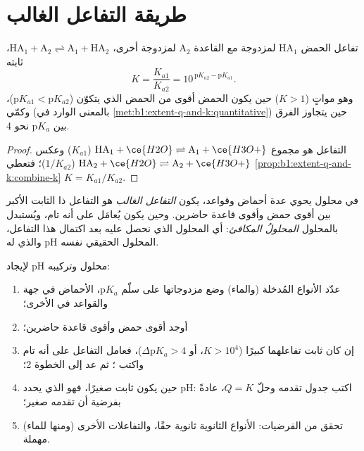 \section{طريقة التفاعل الغالب}

\begin{proposition}\label{prop:b1:predominant-reaction:k-of-reaction}
تفاعل الحمض $\mathrm{HA}_1$ لمزدوجة مع القاعدة
$\mathrm{A}_2$ لمزدوجة أخرى،
$\mathrm{HA}_1 + \mathrm{A}_2 \rightleftharpoons \mathrm{A}_1 + \mathrm{HA}_2$،
ثابته
\[
  K = \frac{K_{a1}}{K_{a2}} = 10^{\,\mathrm{p}K_{a2} - \mathrm{p}K_{a1}} .
\]
وهو مواتٍ ($K > 1$) حين يكون الحمض أقوى من الحمض الذي
يتكوّن ($\mathrm{p}K_{a1} < \mathrm{p}K_{a2}$)، وكمّي (بالمعنى
الوارد في \cref{met:b1:extent-q-and-k:quantitative}) حين يتجاوز الفرق
بين $\mathrm{p}K_a$ نحو 4.
\end{proposition}

\begin{proof}
التفاعل هو مجموع $\mathrm{HA}_1 + \ce{H2O} \rightleftharpoons
\mathrm{A}_1 + \ce{H3O+}$ ($K_{a1}$) وعكس $\mathrm{HA}_2 +
\ce{H2O} \rightleftharpoons \mathrm{A}_2 + \ce{H3O+}$ ($1/K_{a2}$)؛
فتعطي \cref{prop:b1:extent-q-and-k:combine-k} $K = K_{a1}/K_{a2}$.
\end{proof}

\begin{definition}\label{def:b1:predominant-reaction:predominant-reaction}
في محلول يحوي عدة أحماض وقواعد، يكون \emph{التفاعل
الغالب} هو التفاعل ذا الثابت الأكبر
بين أقوى حمض وأقوى قاعدة حاضرين. وحين يكون
 يُعامَل على أنه تام، ويُستبدل بالمحلول
\emph{المحلولُ المكافئ}: أي المحلول
الذي نحصل عليه بعد اكتمال هذا التفاعل، والذي له pH المحلول
الحقيقي نفسه.
\end{definition}

\begin{method}\label{met:b1:predominant-reaction:method}
لإيجاد pH محلول وتركيبه:
\begin{enumerate}
  \item عدّد الأنواع المُدخلة (والماء) وضع مزدوجاتها
        على سلّم $\mathrm{p}K_a$، الأحماض في جهة والقواعد في الأخرى؛
  \item أوجد أقوى حمض وأقوى قاعدة حاضرين؛
  \item إن كان ثابت تفاعلهما كبيرًا ($K > 10^4$، أو
        $\Delta\mathrm{p}K_a > 4$)، فعامل التفاعل على أنه تام واكتب
        ؛ ثم عد إلى الخطوة 2؛
  \item حين يكون ثابت  صغيرًا، فهو الذي يحدد
        pH: اكتب جدول تقدمه وحلّ $Q = K$، عادةً بفرضية
        أن تقدمه صغير؛
  \item تحقق من الفرضيات: الأنواع الثانوية ثانوية حقًا،
        والتفاعلات الأخرى (ومنها  للماء)
        مهملة.
\end{enumerate}
\end{method}

